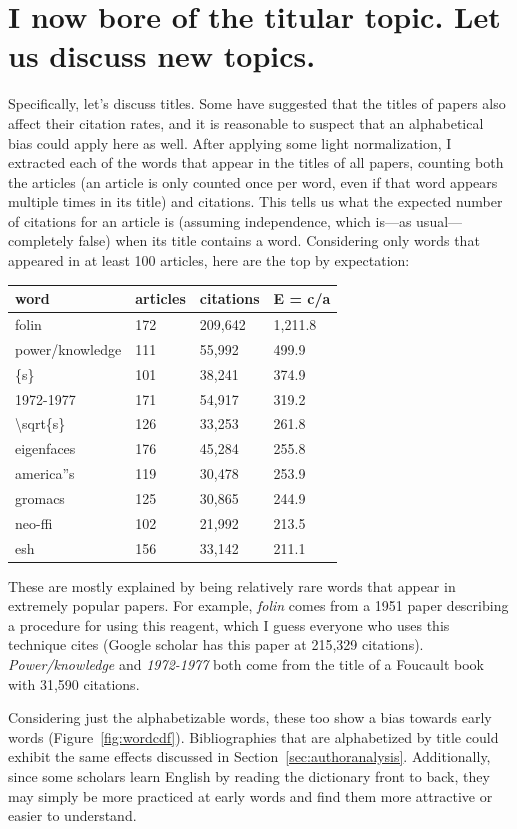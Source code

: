 \documentclass[twocolumn]{article}
\begin{document}
\section{I now bore of the titular topic. Let us discuss new topics.}

Specifically, let's discuss titles. Some have suggested that the
titles of papers also affect their citation rates, and it is
reasonable to suspect that an alphabetical bias could apply here as
well. After applying some light normalization, I extracted each of the
words that appear in the titles of all papers, counting both the
articles (an article is only counted once per word, even if that word
appears multiple times in its title) and citations. This tells us
what the expected number of citations for an article is (assuming
independence, which is---as usual---completely false) when its
title contains a word. Considering only words that appeared in
at least 100 articles, here are the top by expectation:

\begin{tabular}{l|l|l|l}
{\bf word} & {\bf articles} & {\bf citations} & {\bf E = c/a} \\
  \hline
folin & 172 & 209,642 & 1,211.8 \\
power/knowledge & 111 & 55,992 & 499.9 \\
\{s\} & 101 & 38,241 & 374.9 \\
1972-1977 & 171 & 54,917 & 319.2 \\
\textbackslash sqrt\{s\} & 126 & 33,253 & 261.8 \\
eigenfaces & 176 & 45,284 & 255.8 \\
america''s & 119 & 30,478 & 253.9 \\
gromacs & 125 & 30,865 & 244.9 \\
neo-ffi & 102 & 21,992 & 213.5 \\
esh & 156 & 33,142 & 211.1 \\
\end{tabular}

These are mostly explained by being relatively rare words that appear
in extremely popular papers. For example, {\em folin} comes from a
1951 paper\cite{lowry1951protein} describing a procedure for using
this reagent, which I guess everyone who uses this technique cites
(Google scholar has this paper at 215,329 citations). {\em
  Power/knowledge} and {\em 1972-1977} both come from the title of a
Foucault book\cite{foucault1980power} with 31,590 citations.

Considering just the alphabetizable words, these too show a bias
towards early words (Figure~\ref{fig:wordcdf}). Bibliographies that
are alphabetized by title could exhibit the same effects discussed in
Section~\ref{sec:authoranalysis}. Additionally, since some scholars
learn English by reading the dictionary front to back, they may
simply be more practiced at early words and find them more attractive
or easier to understand.
\end{document}
